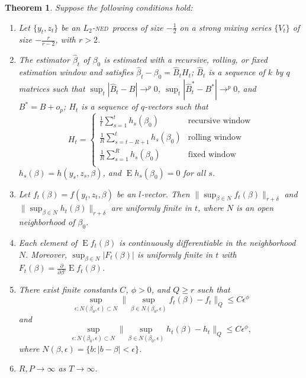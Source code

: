 \documentclass[12pt,fleqn]{article}
\newtheorem{thm}{Theorem}
\theoremstyle{definition}
\DeclareMathOperator{\E}{E}
\newcommand{\dd}[1]{\frac{\partial}{\partial #1}}
\newcommand{\ned}{\textsc{ned}}
\begin{document}
\begin{thm}\label{res:3}
  Suppose the following conditions hold:
  \begin{enumerate}
  \item Let $\{y_t, z_t\}$ be an $L_2$-\ned\ process of size $-\frac12$ on
    a strong mixing series $\{V_t\}$ of size $-\frac{r}{r-2}$, with $r
    > 2$.
  \item The estimator $\hat{\beta}_t$ of $\beta_0$ is estimated with a
    recursive, rolling, or fixed estimation window and satisfies
    $\hat{\beta}_{t} - \beta_{0} = \hat{B}_{t} H_t$; $\hat{B}_{t}$ is
    a sequence of $k$ by $q$ matrices such that $\sup_t |\hat{B}_t -
    B| \to^p 0$, $\sup_t |\hat{B}_t^{*} - B^{*}| \to^p 0$, and $B^{*}
    = B + o_p$; $H_{t}$ is a sequence of $q$-vectors such that 
    \begin{equation}
      H_{t} = \begin{cases} 
        \tfrac1t \sum_{s=1}^t h_{s}(\beta_{0}) & \text{recursive window} \\
        \tfrac1R \sum_{s=t-R+1}^t h_{s}(\beta_{0}) & \text{rolling window} \\
        \tfrac1R \sum_{s=1}^R h_{s}(\beta_{0}) & \text{fixed window} \\
      \end{cases}
    \end{equation}
    $h_{s}(\beta) = h(y_{s}, z_{s}, \beta)$, and $\E h_{s}(\beta_{0})
    = 0$ for all $s$.
  \item Let $f_{t}(\beta) = f(y_{t}, z_{t}, \beta)$ be an $l$-vector.
    Then $\| \sup_{\beta \in N} f_{t}(\beta) \|_{r+\delta}$ and $\|
    \sup_{\beta \in N} h_{t}(\beta) \|_{r+\delta}$ are uniformly
    finite in $t$, where $N$ is an open neighborhood of $\beta_{0}$.
  \item Each element of $\E f_{t}(\beta)$ is continuously
    differentiable in the neighborhood $N$.  Moreover, $\sup_{\beta
      \in N} | F_{t}(\beta) |$ is uniformly finite in $t$ with
    $F_{t}(\beta) = \dd{\beta'} \E f_{t}(\beta)$.
  \item There exist finite constants $C$, $\phi > 0$, and $Q \geq r$
    such that \[\sup_{\epsilon : N(\beta_{0}, \epsilon) \subset N}\|
    \sup_{\beta \in N(\beta_{0}, \epsilon)} f_{t}(\beta) - f_{t} \|_Q
    \leq C \epsilon^{\phi}\] and \[\sup_{\epsilon : N(\beta_{0},
      \epsilon) \subset N}\| \sup_{\beta \in N(\beta_{0}, \epsilon)}
    h_{t}(\beta) - h_{t} \|_Q \leq C \epsilon^{\phi},\] where
    $N(\beta, \epsilon) = \{b : |b - \beta| < \epsilon\}$.
  \item $R, P \to \infty$ as $T \to \infty$.

\end{enumerate}
\end{thm}
\end{document}
